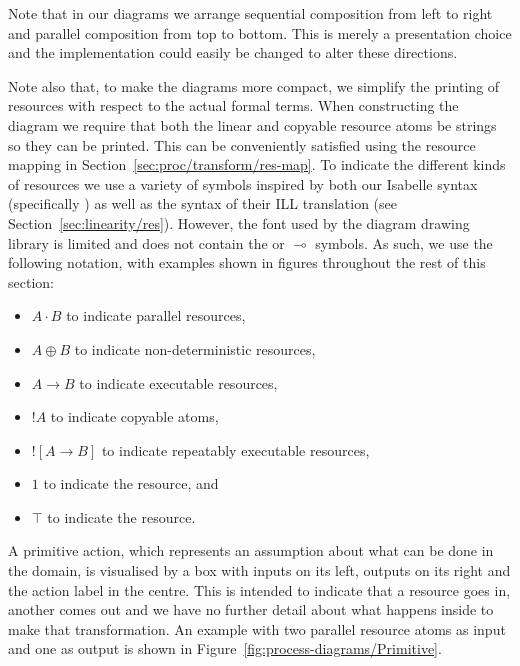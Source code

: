 \documentclass[class=smolathesis,crop=false]{standalone}
\begin{document}
Note that in our diagrams we arrange sequential composition from left to right and parallel composition from top to bottom.
This is merely a presentation choice and the implementation could easily be changed to alter these directions.

\cbstart
Note also that, to make the diagrams more compact, we simplify the printing of resources with respect to the actual formal terms.
When constructing the diagram we require that both the linear and copyable resource atoms be strings so they can be printed.
This can be conveniently satisfied using the resource mapping in Section~\ref{sec:proc/transform/res-map}.
To indicate the different kinds of resources we use a variety of symbols inspired by both our Isabelle syntax (specifically \isa{\isasymodot}) as well as the syntax of their ILL translation (see Section~\ref{sec:linearity/res}).
However, the font used by the diagram drawing library is limited and does not contain the \isa{\isasymodot} or $\multimap$ symbols.
As such, we use the following notation, with examples shown in figures throughout the rest of this section:
\begin{itemize}
  \item $A \cdot B$ to indicate parallel resources,
  \item $A \oplus B$ to indicate non-deterministic resources,
  \item $A \to B$ to indicate executable resources,
  \item $!A$ to indicate copyable atoms,
  \item $![A \to B]$ to indicate repeatably executable resources,
  \item $1$ to indicate the  resource, and
  \item $\top$ to indicate the  resource.
\end{itemize}


A primitive action, which represents an assumption about what can be done in the domain, is visualised by a box with inputs on its left, outputs on its right and the action label in the centre.
This is intended to indicate that a resource goes in, another comes out and we have no further detail about what happens inside to make that transformation.
An example with two parallel resource atoms as input and one as output is shown in Figure~\ref{fig:process-diagrams/Primitive}.
\cbend
\end{document}
